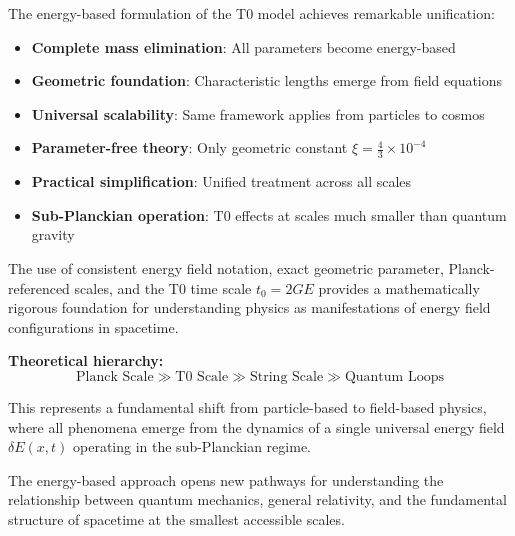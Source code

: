 \documentclass[12pt,a4paper]{report}
\newcommand{\tzero}{t_0}                  %
\begin{document}
The energy-based formulation of the T0 model achieves remarkable unification:

\begin{itemize}
	\item \textbf{Complete mass elimination}: All parameters become energy-based
	\item \textbf{Geometric foundation}: Characteristic lengths emerge from field equations
	\item \textbf{Universal scalability}: Same framework applies from particles to cosmos
	\item \textbf{Parameter-free theory}: Only geometric constant $\xi = \frac{4}{3} \times 10^{-4}$
	\item \textbf{Practical simplification}: Unified treatment across all scales
	\item \textbf{Sub-Planckian operation}: T0 effects at scales much smaller than quantum gravity
\end{itemize}

The use of consistent energy field notation, exact geometric parameter, Planck-referenced scales, and the T0 time scale $\tzero = 2GE$ provides a mathematically rigorous foundation for understanding physics as manifestations of energy field configurations in spacetime.

\textbf{Theoretical hierarchy:}
\begin{equation}
	\text{Planck Scale} \gg \text{T0 Scale} \gg \text{String Scale} \gg \text{Quantum Loops}
\end{equation}

This represents a fundamental shift from particle-based to field-based physics, where all phenomena emerge from the dynamics of a single universal energy field $\delta E(x,t)$ operating in the sub-Planckian regime.

The energy-based approach opens new pathways for understanding the relationship between quantum mechanics, general relativity, and the fundamental structure of spacetime at the smallest accessible scales.	
\end{document}
